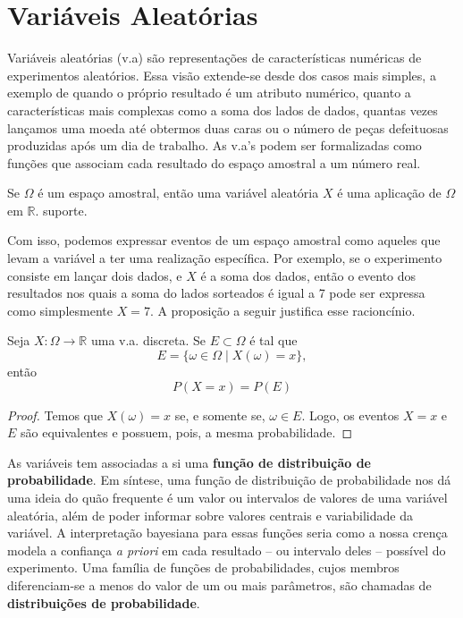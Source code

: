 \section{Variáveis Aleatórias}

Variáveis aleatórias (v.a) são representações de características numéricas de
experimentos aleatórios. Essa visão extende-se desde dos casos mais simples, a exemplo de
quando o próprio resultado é um atributo numérico, quanto a características mais complexas
como a soma dos lados de dados, quantas vezes lançamos uma moeda até
obtermos duas caras ou o número de peças defeituosas produzidas após um dia de trabalho.
As v.a's podem ser formalizadas como funções que  associam cada resultado do
espaço amostral a um número real.

\begin{def:va}
Se $\Omega$ é um espaço amostral, então uma variável aleatória $X$ é uma aplicação
de $\Omega$ em $\mathbb{R}$.
suporte.
\end{def:va}

Com isso, podemos expressar eventos de um espaço amostral como aqueles que levam a variável
a ter uma realização específica. Por exemplo, se o experimento consiste em lançar dois
dados, e $X$ é a soma dos dados, então o evento dos resultados nos quais a soma do lados
sorteados é igual a 7 pode ser expressa como simplesmente $X = 7$. A proposição a seguir
justifica esse racioncínio.

\begin{prop:prob va}
Seja $X: \Omega \to \mathbb{R}$ uma v.a. discreta. Se $E \subset \Omega$ é tal que
\[
	E = \{\omega \in \Omega \mid X(\omega) = x\},
\] então
\[
	P(X = x) = P(E)
\]
\begin{proof}
	Temos que $X(\omega) = x$ se, e somente se, $\omega \in E$. Logo, os eventos $X = x$
	e $E$ são equivalentes e possuem, pois, a mesma probabilidade.
\end{proof}
\end{prop:prob va}

As variáveis tem associadas a si uma \textbf{função de distribuição de probabilidade}.
Em síntese, uma função de distribuição de probabilidade nos dá uma ideia do quão
frequente é um valor ou intervalos de valores de uma variável aleatória, além de poder
informar sobre valores centrais e variabilidade da variável. A interpretação bayesiana
para essas funções seria como a nossa crença modela a confiança \textit{a priori} em cada
resultado -- ou intervalo deles -- possível do experimento. Uma família de funções de
probabilidades, cujos membros diferenciam-se a menos do valor de um ou mais parâmetros,
são chamadas de \textbf{distribuições de probabilidade}.

